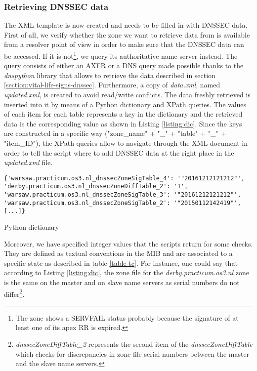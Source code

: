 \subsubsection{Retrieving DNSSEC data}
The XML template is now created and needs to be filled in with DNSSEC data. First of all, we verify whether the zone we want to retrieve data from is available from a resolver point of view in order to make sure that the DNSSEC data can be accessed. If it is not\footnote{The zone shows a SERVFAIL status probably because the signature of at least one of its apex RR is expired.}, we query its authoritative name server instead. The query consists of either an AXFR or a DNS query made possible thanks to the \textit{dnspython} library that allows to retrieve the data described in section \ref{section:vital-life-signs-dnssec}. Furthermore, a copy of \textit{data.xml}, named \textit{updated.xml}, is created to avoid read/write conflicts. The data freshly retrieved is inserted into it by means of a Python dictionary and XPath queries. The values of each item for each table represents a key in the dictionary and the retrieved data is the corresponding value as shown in Listing \ref{listing:dic}. Since the keys are constructed in a specific way ("zone\_name" + "\_" + "table" + "\_" + "item\_ID"), the XPath queries allow to navigate through the XML document in order to tell the script where to add DNSSEC data at the right place in the \textit{updated.xml} file. 
\begin{listing}
\begin{verbatim}
{'warsaw.practicum.os3.nl_dnssecZoneSigTable_4': '"20161212121212"',
'derby.practicum.os3.nl_dnssecZoneDiffTable_2': '1',
'warsaw.practicum.os3.nl_dnssecZoneSigTable_3': '"20161212121212"',
'warsaw.practicum.os3.nl_dnssecZoneSigTable_2': '"20150112142419"', 
[...]}
\end{verbatim}
\caption{Python dictionary}
\label{listing:dic}
\end{listing}
Moreover, we have specified integer values that the scripts return for some checks. They are defined as textual conventions in the MIB and are associated to a specific state as described in table \ref{table-tc}. For instance, one could say that according to Listing
\ref{listing:dic}, the zone file for the \textit{derby.practicum.os3.nl} zone is the
same on the master and on slave name servers as serial numbers do not
differ\footnote{\textit{dnssecZoneDiffTable\_2} represents the second item of the
\textit{dnssecZoneDiffTable} which checks for discrepancies in zone file serial
numbers between the master and the slave name servers.}.


